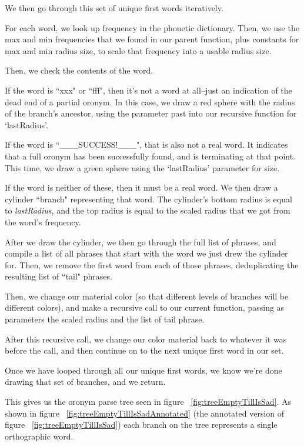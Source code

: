 We then go through this set of unique first words iteratively.

For each word, we look up frequency in the phonetic dictionary.  Then, we use the max and min frequencies that we found in our parent function, plus constants for max and min radius size, to scale that frequency into a usable radius size. 

Then, we check the contents of the word. 

If the word is ``xxx" or ``fff", then it's not a word at all--just an indication of the dead end of a partial oronym.  In this case, we draw a red sphere with the radius of the branch's ancestor, using the parameter past into our recursive function for `lastRadius'.  

If the word is ``\_\_\_SUCCESS!\_\_\_", that is also not a real word. It indicates that a full oronym has been successfully found, and is terminating at that point. This time, we draw a green sphere using the `lastRadius' parameter for size.

If the word is neither of these, then it must be a real word.  We then draw a cylinder ``branch" representing that word. The cylinder's bottom radius is equal to \emph{lastRadius}, and the top radius is equal to the scaled radius that we got from the word's frequency.  

After we draw the cylinder, we then go through the full list of phrases, and compile a list of all phrases that start with the word we just drew the cylinder for.  Then, we remove the first word from each of those phrases, deduplicating the resulting list of ``tail" phrases.

Then, we change our material color (so that different levels of branches will be different colors), and make a recursive call to our current function, passing as parameters the scaled radius and the list of tail phrase.

After this recursive call, we change our color material back to whatever it was before the call, and then continue on to the next unique first word in our set.


Once we have looped through all our unique first words, we know we're done drawing that set of branches, and we return.  

This gives us the oronym parse tree seen in figure ~\ref{fig:treeEmptyTillIsSad}.  As shown in figure ~\ref{fig:treeEmptyTillIsSadAnnotated} (the annotated version of figure ~\ref{fig:treeEmptyTillIsSad}) each branch on the tree represents a single orthographic word.


